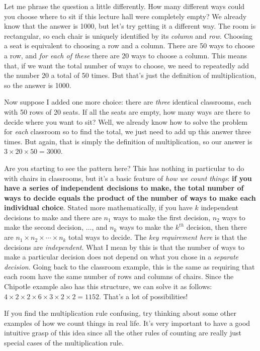\documentclass[12pt]{article}
\begin{document}
Let me phrase the question a little differently.
How many different ways could you choose where to sit if this lecture hall were completely empty?
We already know that the answer is 1000, but let's try getting it a different way.
The room is rectangular, so each chair is uniquely identified by its \emph{column} and \emph{row}.
Choosing a seat is equivalent to choosing a row and a column.
There are 50 ways to choose a row, and \emph{for each of these} there are 20 ways to choose a column.
This means that, if we want the total number of ways to choose, we need to repeatedly add the number 20 a total of 50 times.
But that's just the definition of multiplication, so the answer is 1000.

Now suppose I added one more choice: there are \emph{three} identical classrooms, each with 50 rows of 20 seats.
If all the seats are empty, how many ways are there to decide where you want to sit?
Well, we already know how to solve the problem for \emph{each} classroom so to find the total, we just need to add up this answer three times.
But again, that is simply the definition of multiplication, so our answer is $3 \times 20 \times 50 = 3000$.

Are you starting to see the pattern here?
This has nothing in particular to do with chairs in classrooms, but it's a basic feature of \emph{how we count things}: \textbf{if you have a series of independent decisions to make, the total number of ways to decide equals the product of the number of ways to make each individual choice}.
Stated more mathematically, if you have $k$ independent decisions to make and there are $n_1$ ways to make the first decision, $n_2$ ways to make the second decision, $\hdots$, and $n_k$ ways to make the $k^{th}$ decision, then there are $n_1 \times n_2 \times \cdots \times n_k$ total ways to decide.
The \emph{key requirement here} is that the decisions are \emph{independent}.
What I mean by this is that the number of ways to make a particular decision does not depend on what you chose in a \emph{separate decision}.
Going back to the classroom example, this is the same as requiring that each room have the same number of rows and columns of chairs.
Since the Chipotle example also has this structure, we can solve it as follows: $4 \times 2 \times 2 \times 6 \times 3 \times 2 \times 2 = 1152$.
That's a lot of possibilities!

If you find the multiplication rule confusing, try thinking about some other examples of how we count things in real life.
It's very important to have a good intuitive grasp of this idea since all the other rules of counting are really just special cases of the multiplication rule.
\end{document}

